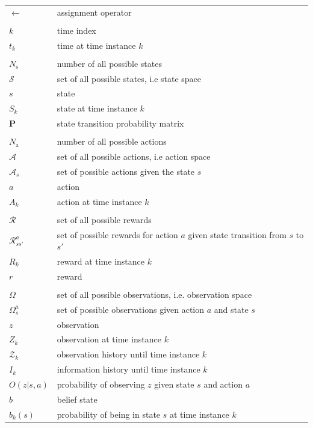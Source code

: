 \documentclass[english, 12pt, a4paper, elec, utf8, a-1b, online]{aaltothesis}
\renewcommand{\vec}[1]{\mathbf{#1}}
\newcommand{\Ss}{\mathcal{S}}
\newcommand{\As}{\mathcal{A}}
\newcommand{\Rs}{\mathcal{R}}
\newcommand{\Os}{\Omega}
\newcommand{\Op}{O}
\newcommand{\stprobs}{\vec{P}}
\newcommand{\nacts}{{N_\text{a}}}
\newcommand{\nstates}{{N_\text{s}}}
\begin{document}
\begin{longtable}{ll}
$\leftarrow$ & assignment operator \\
&\\
$k$ & time index \\
$t_k$ & time at time instance $k$ \\
&\\
$\nstates$ & number of all possible states \\
$\Ss$ & set of all possible states, i.e state space \\
$s$ & state \\
$S_k$ & state at time instance $k$ \\
$\stprobs$ & state transition probability matrix \\
&\\
$\nacts$ & number of all possible actions \\
$\As$ & set of all possible actions, i.e action space \\
$\As_s$ & set of possible actions given the state $s$ \\
$a$ & action \\
$A_k$ & action at time instance $k$ \\
&\\
$\Rs$ & set of all possible rewards \\
$\Rs_{ss'}^a$ & set of possible rewards for action $a$ given state transition from $s$ to $s'$ \\
$R_k$ & reward at time instance $k$ \\
$r$ & reward \\
&\\
$\Os$ & set of all possible observations, i.e. observation space \\
$\Os_s^a$ & set of possible observations given action $a$ and state $s$ \\
$z$ & observation \\
$Z_k$ & observation at time instance $k$ \\
$\mathcal{Z}_k$ & observation history until time instance $k$ \\
$I_k$ & information history until time instance $k$ \\
$\Op(z | s, a)$ & probability of observing $z$ given state $s$ and action $a$ \\
$b$ & belief state \\
$b_k(s)$ & probability of being in state $s$ at time instance $k$ \\

\end{longtable}
\end{document}
